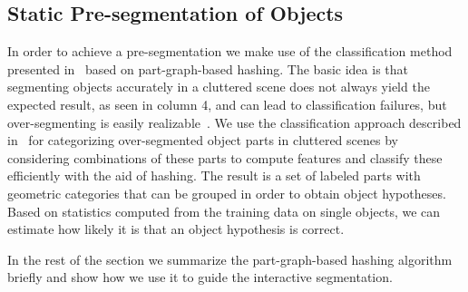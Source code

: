 \subsection{Static Pre-segmentation of Objects}
\label{sec:static-seg}

In order to achieve a pre-segmentation we make use of the classification method presented 
in~\cite{marton12SC} based on part-graph-based hashing.
The basic idea is that segmenting objects accurately 
in a cluttered scene does not always yield the expected result, as seen in %
column 4, and can lead to classification failures, 
but over-segmenting is easily realizable~\cite{soupofsegments,Lai_Fox_2010,mozos11furniture}. 
We use the classification approach described in~\cite{marton12SC} 
for categorizing over-segmented object parts in cluttered scenes
by considering combinations of these parts to compute features
and classify these efficiently with the aid of hashing.
The result is a set of labeled parts with geometric categories
that can be grouped in order to obtain object hypotheses.
Based on statistics computed from the training data on single objects, 
we can estimate how likely it is that an object hypothesis is
correct.


In the rest of the section we summarize the part-graph-based 
hashing algorithm briefly and show how we use it to guide
the interactive segmentation.

